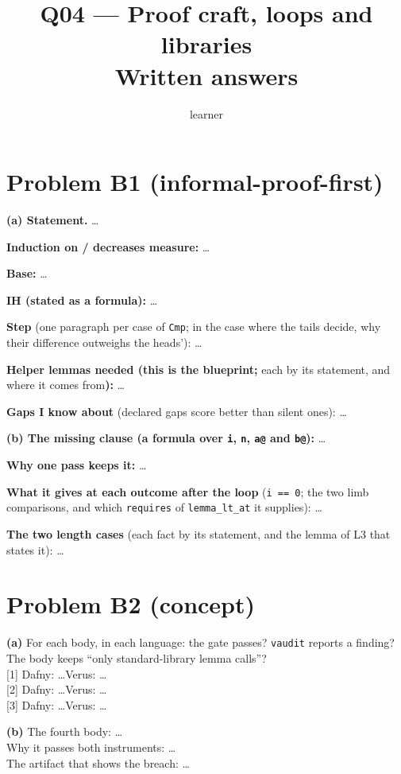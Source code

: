 \documentclass[11pt]{article}
\title{Q04 --- Proof craft, loops and libraries \\ \large Written answers}
\author{learner}
\date{}
\begin{document}
\maketitle

\section*{Problem B1 (informal-proof-first)}\label{ans:B1}
\begin{answer}
\textbf{(a) Statement.} \dots

\textbf{Induction on / decreases measure:} \dots

\textbf{Base:} \dots

\textbf{IH (stated as a formula):} \dots

\textbf{Step} (one paragraph per case of \texttt{Cmp}; in the case where the
tails decide, why their difference outweighs the heads'): \dots

\textbf{Helper lemmas needed (this is the blueprint;} each by its statement,
and where it comes from\textbf{):} \dots

\textbf{Gaps I know about} (declared gaps score better than silent ones): \dots

\textbf{(b) The missing clause (a formula over \texttt{i}, \texttt{n},
\texttt{a@} and \texttt{b@}):} \dots

\textbf{Why one pass keeps it:} \dots

\textbf{What it gives at each outcome after the loop} (\texttt{i == 0}; the
two limb comparisons, and which \texttt{requires} of \texttt{lemma\_lt\_at}
it supplies): \dots

\textbf{The two length cases} (each fact by its statement, and the lemma of
L3 that states it): \dots
\end{answer}

\section*{Problem B2 (concept)}\label{ans:B2}
\begin{answer}
\textbf{(a)} For each body, in each language: the gate passes? \texttt{vaudit}
reports a finding? The body keeps ``only standard-library lemma calls''? \\
{[1]} Dafny: \dots \quad Verus: \dots \\
{[2]} Dafny: \dots \quad Verus: \dots \\
{[3]} Dafny: \dots \quad Verus: \dots

\textbf{(b)} The fourth body: \dots \\
Why it passes both instruments: \dots \\
The artifact that shows the breach: \dots
\end{answer}
\end{document}
